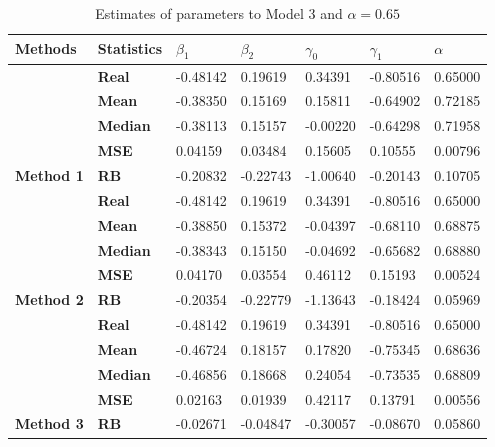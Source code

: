 \begin{table}

\caption{\label{tab:Est_model_3_Alpha0.65}Estimates of parameters to Model 3 and $\alpha=0.65$}
\centering
\begin{tabular}[t]{>{}l>{}llllll}
\toprule
Methods & Statistics & $\beta_1$ & $\beta_2$ & $\gamma_0$ & $\gamma_1$ & $\alpha$\\
\midrule
 & \textbf{Real} & -0.48142 & 0.19619 & 0.34391 & -0.80516 & 0.65000\\
\cmidrule{2-7}
 & \textbf{Mean} & -0.38350 & 0.15169 & 0.15811 & -0.64902 & 0.72185\\
\cmidrule{2-7}
 & \textbf{Median} & -0.38113 & 0.15157 & -0.00220 & -0.64298 & 0.71958\\
\cmidrule{2-7}
 & \textbf{MSE} & 0.04159 & 0.03484 & 0.15605 & 0.10555 & 0.00796\\
\cmidrule{2-7}
\multirow{-5}{*}{\raggedright\arraybackslash \textbf{Method 1}} & \textbf{RB} & -0.20832 & -0.22743 & -1.00640 & -0.20143 & 0.10705\\
\cmidrule{1-7}
 & \textbf{Real} & -0.48142 & 0.19619 & 0.34391 & -0.80516 & 0.65000\\
\cmidrule{2-7}
 & \textbf{Mean} & -0.38850 & 0.15372 & -0.04397 & -0.68110 & 0.68875\\
\cmidrule{2-7}
 & \textbf{Median} & -0.38343 & 0.15150 & -0.04692 & -0.65682 & 0.68880\\
\cmidrule{2-7}
 & \textbf{MSE} & 0.04170 & 0.03554 & 0.46112 & 0.15193 & 0.00524\\
\cmidrule{2-7}
\multirow{-5}{*}{\raggedright\arraybackslash \textbf{Method 2}} & \textbf{RB} & -0.20354 & -0.22779 & -1.13643 & -0.18424 & 0.05969\\
\cmidrule{1-7}
 & \textbf{Real} & -0.48142 & 0.19619 & 0.34391 & -0.80516 & 0.65000\\
\cmidrule{2-7}
 & \textbf{Mean} & -0.46724 & 0.18157 & 0.17820 & -0.75345 & 0.68636\\
\cmidrule{2-7}
 & \textbf{Median} & -0.46856 & 0.18668 & 0.24054 & -0.73535 & 0.68809\\
\cmidrule{2-7}
 & \textbf{MSE} & 0.02163 & 0.01939 & 0.42117 & 0.13791 & 0.00556\\
\cmidrule{2-7}
\multirow{-5}{*}{\raggedright\arraybackslash \textbf{Method 3}} & \textbf{RB} & -0.02671 & -0.04847 & -0.30057 & -0.08670 & 0.05860\\
\bottomrule
\end{tabular}
\end{table}

